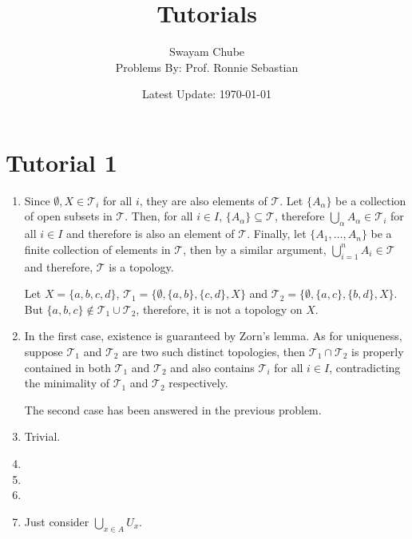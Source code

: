 \documentclass[12pt]{article}
\title{Tutorials}
\author{Swayam Chube\\ Problems By: Prof. Ronnie Sebastian}
\date{Latest Update: \today}
\newcommand{\T}{\mathcal{T}}
\begin{document}
\maketitle
\tableofcontents
\newpage 

\section{Tutorial 1}
\begin{enumerate}
    \item Since $\emptyset,X\in\T_i$ for all $i$, they are also elements of $\T$. Let $\{A_\alpha\}$ be a collection of open subsets in $\T$. Then, for all $i\in I$, $\{A_\alpha\}\subseteq\T$, therefore $\bigcup_{\alpha} A_\alpha\in\T_i$ for all $i\in I$ and therefore is also an element of $\T$. Finally, let $\{A_1,\ldots,A_n\}$ be a finite collection of elements in $\T$, then by a similar argument, $\bigcup_{i = 1}^nA_i\in\T$ and therefore, $\T$ is a topology.

    Let $X = \{a,b,c,d\}$, $\T_1 = \{\emptyset, \{a,b\}, \{c,d\}, X\}$ and $\T_2 = \{\emptyset, \{a,c\}, \{b,d\}, X\}$. But $\{a,b,c\}\notin\T_1\cup\T_2$, therefore, it is not a topology on $X$.

    \item In the first case, existence is guaranteed by Zorn's lemma. As for uniqueness, suppose $\T_1$ and $\T_2$ are two such distinct topologies, then $\T_1\cap\T_2$ is properly contained in both $\T_1$ and $\T_2$ and also contains $\T_i$ for all $i\in I$, contradicting the minimality of $\T_1$ and $\T_2$ respectively.

    The second case has been answered in the previous problem.

    \item Trivial.
    
    \item 
    \item 
    \item 

    \item Just consider $\bigcup_{x\in A}U_x$.
\end{enumerate}
\end{document}
